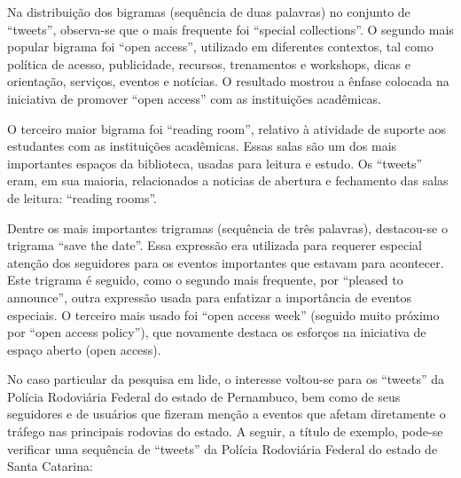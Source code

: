 Na distribuição dos bigramas (sequência de duas palavras) no conjunto de ``tweets'', observa-se que o mais frequente foi “special collections”.
O segundo mais popular bigrama foi “open access”, utilizado em diferentes contextos, tal como política de acesso, publicidade, recursos, trenamentos e workshops, dicas e orientação, serviços, eventos e notícias. O resultado mostrou a ênfase colocada na iniciativa de promover “open access” com as instituições acadêmicas.

O terceiro maior bigrama foi “reading room”, relativo à atividade de suporte aos estudantes com as instituições acadêmicas. Essas salas são um dos mais importantes espaços da biblioteca, usadas para leitura e estudo. Os ``tweets'' eram, em sua maioria, relacionados a noticias de abertura e fechamento das salas de leitura: “reading rooms”.

Dentre os mais importantes trigramas (sequência de três palavras), destacou-se o trigrama “save the date”. Essa expressão era utilizada para requerer especial atenção dos seguidores para os eventos importantes que estavam para acontecer. Este trigrama é seguido, como o segundo mais frequente, por “pleased to announce”, outra expressão usada para enfatizar a importância de eventos especiais. O terceiro mais usado foi “open access week” (seguido muito próximo por “open access policy”), que novamente destaca os esforços na iniciativa de espaço aberto (open access). 

\pagebreak

No caso particular da pesquisa em lide, o interesse voltou-se para os ``tweets'' da Polícia Rodoviária Federal do estado de Pernambuco, bem como de seus seguidores e de usuários que fizeram menção a eventos que afetam diretamente o tráfego nas principais rodovias do estado. A seguir, a título de exemplo, pode-se verificar uma sequência de ``tweets'' da Polícia Rodoviária Federal do estado de Santa Catarina:

\begin{figure}[ht]
	\quad \quad \quad \quad
\end{figure}


